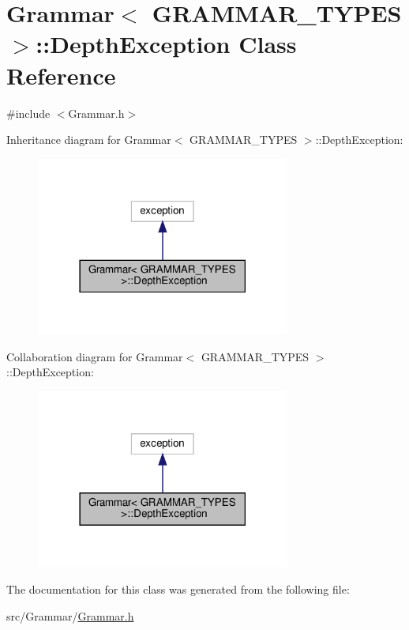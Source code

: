 \hypertarget{class_grammar_1_1_depth_exception}{}\section{Grammar$<$ G\+R\+A\+M\+M\+A\+R\+\_\+\+T\+Y\+P\+ES $>$\+:\+:Depth\+Exception Class Reference}
\label{class_grammar_1_1_depth_exception}


{\ttfamily \#include $<$Grammar.\+h$>$}



Inheritance diagram for Grammar$<$ G\+R\+A\+M\+M\+A\+R\+\_\+\+T\+Y\+P\+ES $>$\+:\+:Depth\+Exception\+:
\nopagebreak
\begin{figure}[H]
\begin{center}
\leavevmode
\includegraphics[width=237pt]{class_grammar_1_1_depth_exception__inherit__graph}
\end{center}
\end{figure}


Collaboration diagram for Grammar$<$ G\+R\+A\+M\+M\+A\+R\+\_\+\+T\+Y\+P\+ES $>$\+:\+:Depth\+Exception\+:
\nopagebreak
\begin{figure}[H]
\begin{center}
\leavevmode
\includegraphics[width=237pt]{class_grammar_1_1_depth_exception__coll__graph}
\end{center}
\end{figure}


The documentation for this class was generated from the following file\+:\begin{DoxyCompactItemize}
\item 
src/\+Grammar/\hyperlink{_grammar_8h}{Grammar.\+h}\end{DoxyCompactItemize}
